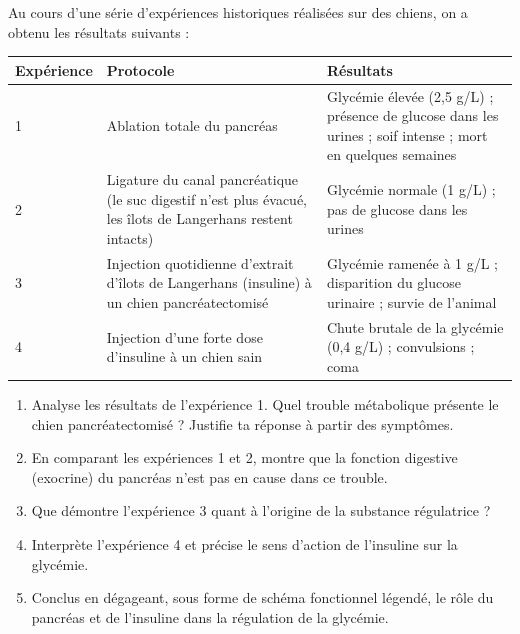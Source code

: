\documentclass[11pt]{article}
\begin{document}
\begin{exercice}
Au cours d'une série d'expériences historiques réalisées sur des chiens, on a obtenu les résultats suivants :
\begin{center}
\begin{tabularx}{\linewidth}{|l|X|X|}
\hline
\rowcolor{popblueL} \textbf{Expérience} & \textbf{Protocole} & \textbf{Résultats} \\
\hline
1 & Ablation totale du pancréas & Glycémie élevée (2,5 g/L) ; présence de glucose dans les urines ; soif intense ; mort en quelques semaines \\
\hline
2 & Ligature du canal pancréatique (le suc digestif n'est plus évacué, les îlots de Langerhans restent intacts) & Glycémie normale (1 g/L) ; pas de glucose dans les urines \\
\hline
3 & Injection quotidienne d'extrait d'îlots de Langerhans (insuline) à un chien pancréatectomisé & Glycémie ramenée à 1 g/L ; disparition du glucose urinaire ; survie de l'animal \\
\hline
4 & Injection d'une forte dose d'insuline à un chien sain & Chute brutale de la glycémie (0,4 g/L) ; convulsions ; coma \\
\hline
\end{tabularx}
\end{center}
\begin{enumerate}
\item Analyse les résultats de l'expérience 1. Quel trouble métabolique présente le chien pancréatectomisé ? Justifie ta réponse à partir des symptômes.
\item En comparant les expériences 1 et 2, montre que la fonction digestive (exocrine) du pancréas n'est pas en cause dans ce trouble.
\item Que démontre l'expérience 3 quant à l'origine de la substance régulatrice ?
\item Interprète l'expérience 4 et précise le sens d'action de l'insuline sur la glycémie.
\item Conclus en dégageant, sous forme de schéma fonctionnel légendé, le rôle du pancréas et de l'insuline dans la régulation de la glycémie.
\end{enumerate}
\end{exercice}
\end{document}
